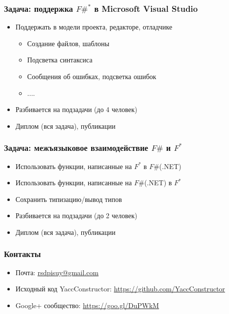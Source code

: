 \documentclass{beamer}
\begin{document}
\begin{frame}
  \transwipe[direction=90]
  \frametitle{Задача: поддержка $F\#^*$ в Microsoft Visual Studio}
  \begin{itemize}
    \item Поддержать в модели проекта, редакторе, отладчике
      \begin{itemize}
        \item Создание файлов, шаблоны
        \item Подсветка синтаксиса
        \item Сообщения об ошибках, подсветка ошибок
        \item ....
      \end{itemize}
    \item Разбивается на подзадачи (до 4 человек)
    \item Диплом (вся задача), публикации
  \end{itemize}
\end{frame}

\begin{frame}
  \transwipe[direction=90]
  \frametitle{Задача: межъязыковое взаимодействие $F\#$ и $F^*$}
  \begin{itemize}
    \item Использовать функции, написанные на $F^*$ в $F\#$(.NET)
    \item Использовать функции, написанные на $F\#$(.NET) в $F^*$
    \item Сохранить типизацию/вывод типов
    \item Разбивается на подзадачи (до 2 человек)
    \item Диплом (вся задача), публикации
  \end{itemize}
\end{frame}
            
\begin{frame}
\transwipe[direction=90]
\frametitle{Контакты}
\begin{itemize}
  \item Почта: \url{rsdpisuy@gmail.com}
  \item Исходный код YaccConstructor: \url{https://github.com/YaccConstructor}
  \item Google+ сообщество: \url{https://goo.gl/DuPWkM}
\end{itemize}
\end{frame}
\end{document}
